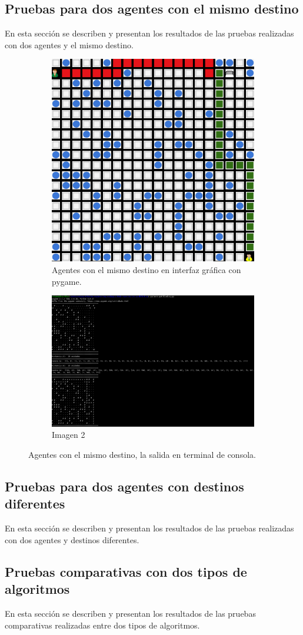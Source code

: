 \documentclass[12pt]{article}
\begin{document}
\subsection{Pruebas para dos agentes con el mismo destino}
En esta sección se describen y presentan los resultados de las pruebas realizadas con dos agentes y el mismo destino.
\begin{figure}
    \centering
    \begin{subfigure}{.5\textwidth}
      \centering
      \includegraphics[width=.4\linewidth]{agente-mismo-destino.png}
      \caption{Agentes con el mismo destino en interfaz gráfica con pygame.}
      
    \end{subfigure}%
    \begin{subfigure}{.5\textwidth}
      \centering
      \includegraphics[width=.4\linewidth]{agente-mismo-destino-2.png}
      \caption{Imagen 2}
      
    \end{subfigure}
    \caption{Agentes con el mismo destino, la salida en terminal de consola.}
    
    \end{figure}

\subsection{Pruebas para dos agentes con destinos diferentes}
En esta sección se describen y presentan los resultados de las pruebas realizadas con dos agentes y destinos diferentes.

\subsection{Pruebas comparativas con dos tipos de algoritmos}
En esta sección se describen y presentan los resultados de las pruebas comparativas realizadas entre dos tipos de algoritmos.
\end{document}
